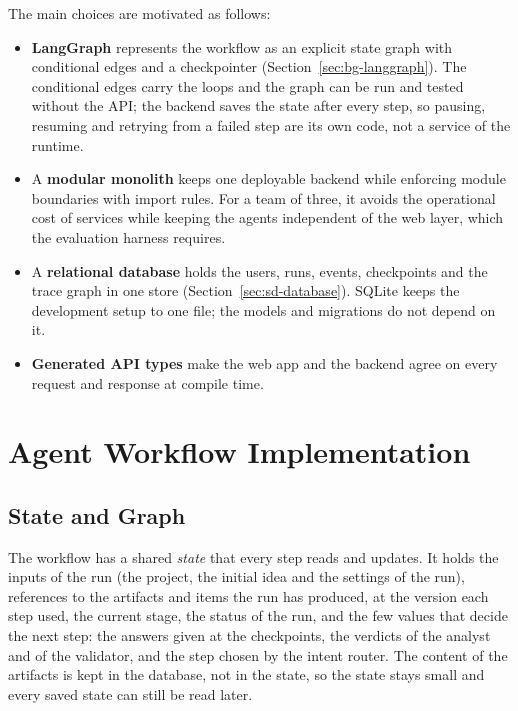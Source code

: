 The main choices are motivated as follows:
\begin{itemize}
    \item \textbf{LangGraph} represents the workflow as an explicit state graph with conditional edges and a checkpointer (Section~\ref{sec:bg-langgraph}). The conditional edges carry the loops and the graph can be run and tested without the API; the backend saves the state after every step, so pausing, resuming and retrying from a failed step are its own code, not a service of the runtime.
    \item A \textbf{modular monolith} keeps one deployable backend while enforcing module boundaries with import rules. For a team of three, it avoids the operational cost of services while keeping the agents independent of the web layer, which the evaluation harness requires.
    \item A \textbf{relational database} holds the users, runs, events, checkpoints and the trace graph in one store (Section~\ref{sec:sd-database}). SQLite keeps the development setup to one file; the models and migrations do not depend on it.
    \item \textbf{Generated API types} make the web app and the backend agree on every request and response at compile time.
\end{itemize}

\section{Agent Workflow Implementation}
\label{sec:impl-agents}

\subsection{State and Graph}
\label{sec:impl-graph}

The workflow has a shared \emph{state} that every step reads and updates. It holds the inputs of the run (the project, the initial idea and the settings of the run), references to the artifacts and items the run has produced, at the version each step used, the current stage, the status of the run, and the few values that decide the next step: the answers given at the checkpoints, the verdicts of the analyst and of the validator, and the step chosen by the intent router. The content of the artifacts is kept in the database, not in the state, so the state stays small and every saved state can still be read later.

